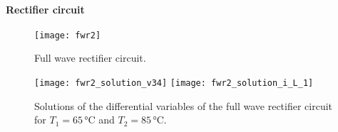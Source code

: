 \documentclass[AMA,STIX1COL]{WileyNJD-v2}
\begin{document}
\paragraph{Rectifier circuit}
\begin{figure}[t]
    \begin{center}
        \texttt{[image: fwr2]}
    \end{center}
    \caption{Full wave rectifier circuit.}
    \label{fig:ne_fwr2}
\end{figure}

\begin{figure}[b]
    \begin{center}
        \texttt{[image: fwr2\_solution\_v34]} \hspace{1.5cm} \texttt{[image: fwr2\_solution\_i\_L\_1]}
    \end{center}
    \caption{Solutions of the differential variables of the full wave rectifier circuit for $T_1 = 65\, \si{\celsius}$ and $T_2 = 85\, \si{\celsius}$.}
    \label{fig:ne_fwr2_solution_d}
\end{figure}
\end{document}
